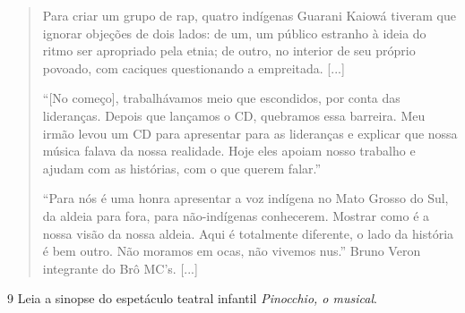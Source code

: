\begin{quote}
Para criar um grupo de rap, quatro indígenas Guarani Kaiowá tiveram que
ignorar objeções de dois lados: de um, um público estranho à ideia do
ritmo ser apropriado pela etnia; de outro, no interior de seu próprio
povoado, com caciques questionando a empreitada. {[}...{]}

``{[}No começo{]}, trabalhávamos meio que escondidos, por conta das
lideranças. Depois que lançamos o CD, quebramos essa barreira. Meu irmão
levou um CD para apresentar para as lideranças e explicar que nossa
música falava da nossa realidade. Hoje eles apoiam nosso trabalho e
ajudam com as histórias, com o que querem falar.''

``Para nós é uma honra apresentar a voz indígena no Mato Grosso do Sul,
da aldeia para fora, para não-indígenas conhecerem. Mostrar como é a
nossa visão da nossa aldeia. Aqui é totalmente diferente, o lado da
história é bem outro. Não moramos em ocas, não vivemos nus.'' Bruno
Veron integrante do Brô MC's. {[}...{]}

\end{quote}


\num{9} Leia a sinopse do espetáculo teatral infantil \emph{Pinocchio, o musical}.

